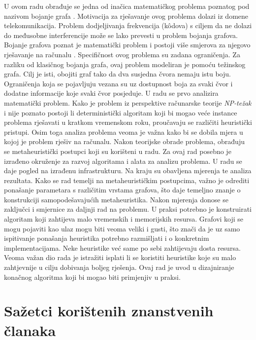 \documentclass[times, utf8, diplomski, numeric]{fer}
\begin{document}
U ovom radu obrađuje se jedna od inačica matematičkog problema poznatog pod nazivom bojanje grafa . Motivacija za rješavanje ovog problema dolazi iz domene telekomunikacija. Problem dodjeljivanja frekvencija (k\^{o}dova) s ciljem da ne dolazi do međusobne interferencije može se lako prevesti u problem bojanja grafova. Bojanje grafova poznat je matematički problem i postoji više smjerova za njegovo rješavanje na računalu \cite{lit8}. Specifičnost ovog problema su zadana ograničenja. Za razliku od klasičnog bojanja grafa, ovaj problem modeliran je pomoću težinskog grafa. Cilj je isti, obojiti graf tako da dva susjedna čvora nemaju istu boju. Ograničenja koja se pojavljuju vezana su uz dostupnost boja za svaki čvor i dodatne informacije koje svaki čvor posjeduje. U radu se prvo analizira matematički problem. Kako je problem iz perspektive računarske teorije \emph{NP-težak} i nije poznato postoji li  deterministički algoritam koji bi mogao veće instance problema rješavati u kratkom vremenskom roku, proučavaju se različiti heuristički pristupi. Osim toga analiza problema veoma je važna kako bi se dobila mjera u kojoj je problem rješiv na računalu. Nakon teorijske obrade problema, obrađuju se metaheuristički postupci koji su korišteni u radu. Za ovaj rad posebno je izrađeno okruženje za razvoj algoritama i alata za analizu problema. U radu se daje pogled na izrađenu infrastrukturu. Na kraju su obavljena mjerenja te analiza rezultata. Kako se rad temelji na metaheurističkim postupcima, važno je odrediti ponašanje parametara s različitim vrstama grafova, što daje temeljno znanje o konstrukciji samopodešavajućih metaheuristika. Nakon mjerenja donose se zaključci i smjernice za daljnji rad na problemu.
U praksi potrebno je konstruirati algoritam koji zahtijeva malo vremenskih i memorijskih resursa. Grafovi koji se mogu pojaviti kao ulaz mogu biti veoma veliki i gusti, što znači da je uz samo ispitivanje ponašanja heuristika potrebno razmišljati i o konkretnim implementacijama. Neke heuristike već same po sebi zahtijevaju dosta resursa. Veoma važan dio rada je istražiti isplati li se koristiti heuristike koje su malo zahtjevnije u cilju dobivanja boljeg rješenja. Ovaj rad je uvod u dizajniranje konačnog algoritma koji bi mogao biti primjenjiv u praksi.

\section{Sažetci korištenih znanstvenih članaka}
\end{document}
